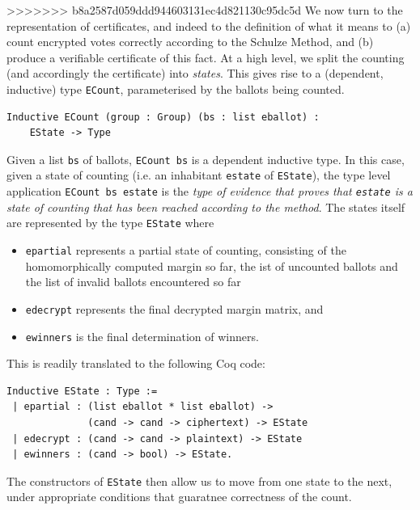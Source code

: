 \documentclass{llncs}
\begin{document}
>>>>>>> b8a2587d059ddd944603131ec4d821130c95dc5d
\fi
  \noindent
  We now turn to the representation of certificates, and indeed to the
  definition of what it means to (a) count encrypted votes correctly
  according to the Schulze Method, and (b) produce a verifiable
  certificate of this fact. At a high level, we split the counting
  (and accordingly the certificate) into \emph{states}. This gives
  rise to a (dependent, inductive) type \texttt{ECount}, parameterised
  by the ballots being counted.

  \begin{lstlisting}[frame=single,basicstyle=\ttfamily\footnotesize]
  Inductive ECount (group : Group) (bs : list eballot) : 
    EState -> Type
  \end{lstlisting}

  \noindent
  Given a list \texttt{bs} of ballots, \texttt{ECount bs} is a
  dependent inductive type. In this case, given a state of counting
  (i.e. an inhabitant \texttt{estate} of \texttt{EState}), the type level application
  \texttt{ECount bs estate} is the \emph{type of evidence that proves
  that \texttt{estate} is a state of counting that has been reached
  according to the method}.  The states itself are represented by
  the type \texttt{EState}
where
\begin{itemize}
 \item \texttt{epartial} represents a partial state of counting,
 consisting of the homomorphically computed margin so far, the ist
 of uncounted ballots and the list of invalid ballots encountered so
 far
 \item \texttt{edecrypt} represents the final decrypted margin
 matrix, and 
 \item \texttt{ewinners} is the final determination of winners. 
\end{itemize}
This is readily translated to the following Coq code:
\begin{lstlisting}[frame=single,basicstyle=\ttfamily\footnotesize]
Inductive EState : Type :=
 | epartial : (list eballot * list eballot) ->
              (cand -> cand -> ciphertext) -> EState
 | edecrypt : (cand -> cand -> plaintext) -> EState
 | ewinners : (cand -> bool) -> EState.
\end{lstlisting}

\noindent
The constructors of \texttt{EState} then allow us to move from one
state to the next, under appropriate conditions that guaratnee
correctness of the count.
\end{document}
